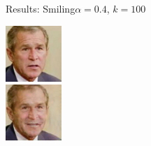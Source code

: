 \documentclass[11pt]{beamer}
\begin{document}
\begin{frame}{Results: Smiling}{$\alpha=0.4$, $k=100$}
\begin{minipage}{81px}
	\end{minipage}%
	\begin{minipage}{81px}
		\includegraphics[width=80px]{../pictures/outputs/start-imgs/Bush.png}\\
		\includegraphics[width=80px]{../pictures/outputs/smiling_alpha0.4_k100/Bush.png}
	\end{minipage}
\end{frame}

\end{document}
